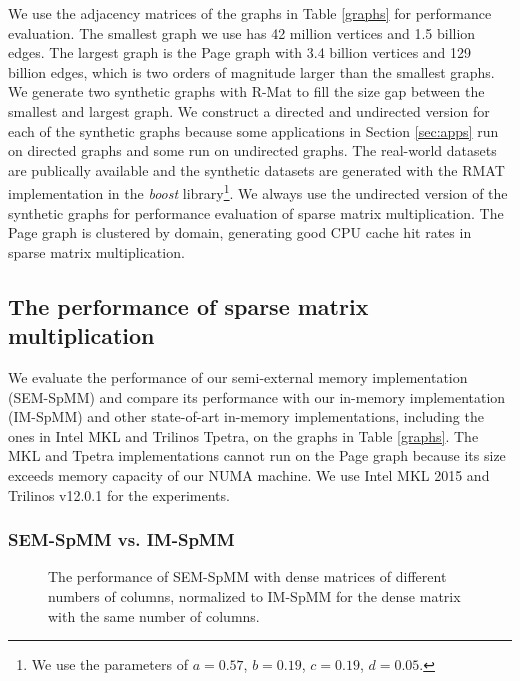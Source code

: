 We use the adjacency matrices of the graphs in Table \ref{graphs} for performance
evaluation. The smallest graph we use has 42 million vertices and 1.5 billion
edges. The largest graph is the Page graph with 3.4 billion vertices
and 129 billion edges, which is two orders of magnitude larger than the smallest
graphs. We generate two synthetic graphs with R-Mat \cite{rmat} to fill the size
gap between the smallest and largest graph. We construct a directed and
undirected version for each of the synthetic graphs because some applications
in Section \ref{sec:apps} run on directed graphs and some run on undirected
graphs. The real-world datasets are publically available and the synthetic
datasets are generated with the RMAT implementation in the \textit{boost}
library\footnote{We use the parameters of $a=0.57$, $b=0.19$, $c=0.19$,
$d=0.05$.}. We always use the undirected version of the synthetic graphs for
performance evaluation of sparse matrix multiplication. The Page graph is
clustered by domain, generating good CPU cache hit rates in sparse matrix
multiplication.

\subsection{The performance of sparse matrix multiplication}

We evaluate the performance of our semi-external memory implementation (SEM-SpMM)
and compare its performance with our in-memory implementation (IM-SpMM) and
other state-of-art in-memory implementations, including the ones in Intel MKL and
Trilinos Tpetra, on the graphs in Table \ref{graphs}. The MKL and Tpetra
implementations cannot run on the Page graph because its size exceeds memory
capacity of our NUMA machine. We use Intel MKL 2015 and Trilinos v12.0.1 for
the experiments.

\subsubsection{SEM-SpMM vs. IM-SpMM}

\begin{figure}
	\begin{center}
		\footnotesize
		
		\caption{The performance of SEM-SpMM with dense matrices of different
			numbers of columns, normalized to IM-SpMM for the dense matrix with
			the same number of columns.}
		\label{perf:spmm_comp}
	\end{center}
\end{figure}

